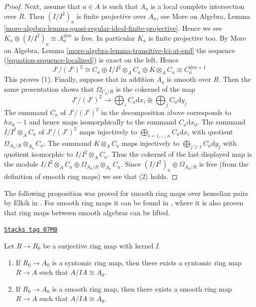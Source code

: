 \begin{proof}
\medskip\noindent
Next, assume that $a \in A$ is such that $A_a$ is a local complete
intersection over $R$. Then $(I/I^2)_a$ is finite projective over $A_a$, see
More on Algebra, Lemma
\ref{more-algebra-lemma-quasi-regular-ideal-finite-projective}.
Hence we see $K_a \oplus (I/I^2)_a \cong A_a^{\oplus m}$ is free.
In particular $K_a$ is finite projective too.
By More on Algebra, Lemma \ref{more-algebra-lemma-transitive-lci-at-end}
the sequence (\ref{equation-sequence-localized}) is exact on the left.
Hence
$$
J'/(J')^2 \cong
C_a \oplus I/I^2 \otimes_A C_a \oplus K \otimes_A C_a \cong
C_a^{\oplus m + 1}
$$
This proves (1). Finally, suppose that in addition $A_a$ is smooth over
$R$. Then the same presentation shows that $\Omega_{C_a/R}$
is the cokernel of the map
$$
J'/(J')^2 \longrightarrow
\bigoplus\nolimits_i C_a\text{d}x_i \oplus \bigoplus\nolimits_j C_a\text{d}y_j
$$
The summand $C_a$ of $J'/(J')^2$ in the decomposition above
corresponds to $hx_0 - 1$ and hence maps
isomorphically to the summand $C_a\text{d}x_0$. The summand
$I/I^2 \otimes_A C_a$ of $J'/(J')^2$ maps injectively to
$\bigoplus_{i = 1, \ldots, n} C_a\text{d}x_i$
with quotient $\Omega_{A_a/R} \otimes_{A_a} C_a$. The summand
$K \otimes_A C_a$ maps injectively to
$\bigoplus_{j \geq 1} C_a\text{d}y_j$ with quotient isomorphic to
$I/I^2 \otimes_A C_a$. Thus the cokernel of the last displayed
map is the module
$I/I^2 \otimes_A C_a \oplus \Omega_{A_a/R} \otimes_{A_a} C_a$.
Since $(I/I^2)_a \oplus \Omega_{A_a/R}$ is
free (from the definition of smooth ring maps) we see that (2) holds.
\end{proof}

The following proposition was proved for smooth ring maps over henselian
pairs by Elkik in \cite{Elkik}. For smooth ring maps it can be found in
\cite{Arabia}, where it is also proven that ring maps between smooth
algebras can be lifted.

\begin{proposition}
\label{smoothing-proposition-lift-smooth}
\href{https://stacks.math.columbia.edu/tag/07M8}{\texttt{Stacks tag 07M8}}


Let $R \to R_0$ be a surjective ring map with kernel $I$.
\begin{enumerate}
\item If $R_0 \to A_0$ is a syntomic ring map, then there exists a syntomic
ring map $R \to A$ such that $A/IA \cong A_0$.
\item If $R_0 \to A_0$ is a smooth ring map, then there exists a smooth
ring map $R \to A$ such that $A/IA \cong A_0$.
\end{enumerate}
\end{proposition}

